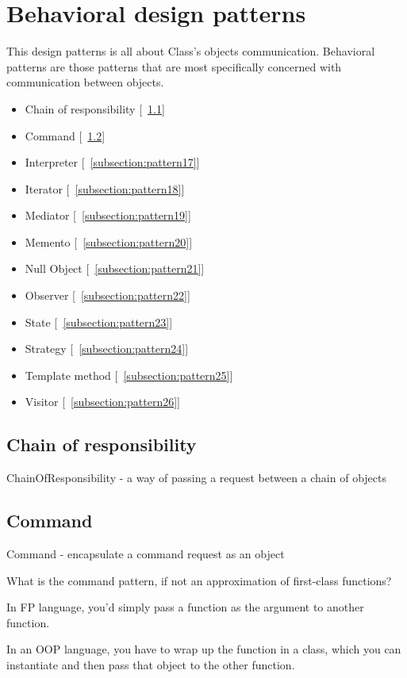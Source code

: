 \section{Behavioral design patterns}
This design patterns is all about Class's objects communication. Behavioral patterns are those patterns that are most specifically concerned with communication between objects.
\begin{itemize}
	\item Chain of responsibility [~\ref{subsection:pattern15}]
	\item Command [~\ref{subsection:pattern16}]
	\item Interpreter [~\ref{subsection:pattern17}]
	\item Iterator [~\ref{subsection:pattern18}]
	\item Mediator [~\ref{subsection:pattern19}]
	\item Memento [~\ref{subsection:pattern20}]
	\item Null Object [~\ref{subsection:pattern21}]
	\item Observer [~\ref{subsection:pattern22}]
	\item State [~\ref{subsection:pattern23}]
	\item Strategy [~\ref{subsection:pattern24}]
	\item Template method [~\ref{subsection:pattern25}]
	\item Visitor [~\ref{subsection:pattern26}]
\end{itemize}

\subsection{Chain of responsibility} \label{subsection:pattern15}
    ChainOfResponsibility - a way of passing a request between a chain of objects

\subsection{Command} \label{subsection:pattern16}
    Command - encapsulate a command request as an object

    What is the command pattern, if not an approximation of first-class functions? 

In FP language, you'd simply pass a function as the argument to another function.

    In an OOP language, you have to wrap up the function in a class, which you can instantiate and then pass that object to the other function.

